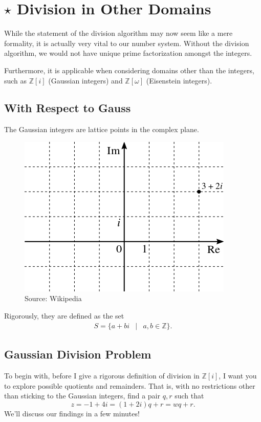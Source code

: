 \clearpage



\section{$\star$ Division in Other Domains}

While the statement of the division algorithm may now seem like a mere formality, it is actually very vital to our number system. Without the division algorithm, we would not have unique prime factorization amongst the integers.

Furthermore, it is applicable when considering domains other than the integers, such as $\mathbb{Z}[i]$ (Gaussian integers) and $\mathbb{Z}[\omega]$ (Eisenstein integers).  


\subsection*{With Respect to Gauss}

The Gaussian integers are lattice points in the complex plane. \cite{iurie}

\begin{figure}[H]
	\centering\includegraphics[width=0.21\linewidth]{images/gauss.png}
	\caption{Source:  Wikipedia}
\end{figure}

Rigorously, they are defined as the set \begin{eqnarray*}S=\{a+bi &|& a,b \in \mathbb{Z}\}. \end{eqnarray*}  

\clearpage

\subsection{Gaussian Division Problem \cite{div:1}}


To begin with, before I give a rigorous definition of division in $\mathbb{Z}[i]$, I want you to explore possible quotients and remainders. That is, with no restrictions other than sticking to the Gaussian integers, find a pair $q,r$ such that $$z=-1+4i=(1+2i)q+r=wq+r.$$   We'll discuss our findings in a few minutes!

